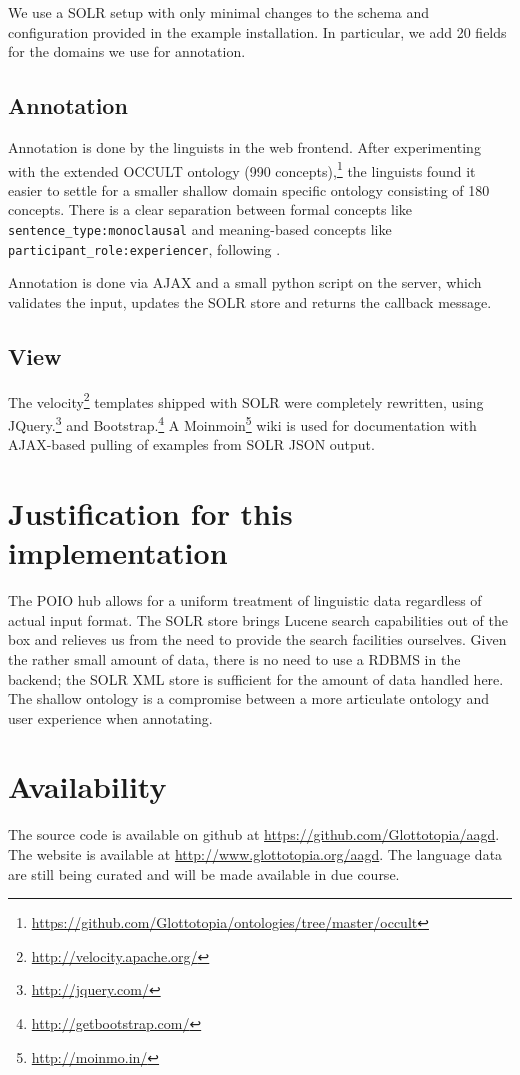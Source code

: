 \documentclass[a4paper,11pt]{article}
\begin{document}
We use a SOLR setup with only minimal changes to the schema and configuration provided in the example installation. In particular, we add 20 fields for the domains we use for annotation.

\subsection{Annotation}
Annotation is done by the linguists in the web frontend. After experimenting with the extended OCCULT ontology (990 concepts),\footnote{\url{https://github.com/Glottotopia/ontologies/tree/master/occult}} the linguists found it easier to settle for a smaller shallow domain specific ontology consisting of 180 concepts. There is a clear separation between formal concepts like  \texttt{\small sen\-tence\_type:monoclausal} and meaning-based concepts like \texttt{\small participant\_role:ex\-pe\-rien\-cer}, following \cite{Nordhoff2012fufomp}.

Annotation is done via AJAX and a small python script on the server, which validates the input, updates the SOLR store and returns the callback message. 

\subsection{View}
The velocity\footnote{\url{http://velocity.apache.org/}} templates shipped with SOLR were completely rewritten, using JQuery.\footnote{\url{http://jquery.com/}}  and  Bootstrap.\footnote{\url{http://getbootstrap.com/}} 
A Moinmoin\footnote{\url{http://moinmo.in/}} wiki is used for documentation with AJAX-based pulling of examples from SOLR JSON output. 
   
\section{Justification for this implementation}  
The POIO hub allows for a uniform treatment of linguistic data regardless of actual input format. The SOLR store brings Lucene search capabilities out of the box and relieves us from the need to provide the search facilities ourselves. Given the rather small amount of data, there is no need to use a RDBMS in the backend; the SOLR XML store is sufficient for the amount of data handled here. The shallow ontology is a compromise between a more articulate ontology and user experience when annotating. 

\section{Availability}
The source code is available on github at {\small\url{https://github.com/Glottotopia/aagd}}.
The website is available at {\small\url{http://www.glottotopia.org/aagd}}.
The language data are still being curated and will be made available in due course. 
 
\end{document}
